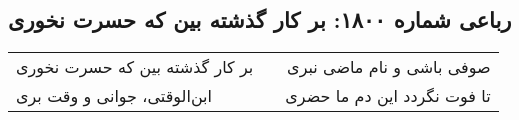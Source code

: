 \begin{center}
\section*{رباعی شماره ۱۸۰۰: بر کار گذشته بین که حسرت نخوری}
\label{sec:1800}
\begin{longtable}{l p{0.5cm} r}
بر کار گذشته بین که حسرت نخوری
&&
صوفی باشی و نام ماضی نبری
\\
ابن‌الوقتی، جوانی و وقت بری
&&
تا فوت نگردد این دم ما حضری
\\
\end{longtable}
\end{center}
